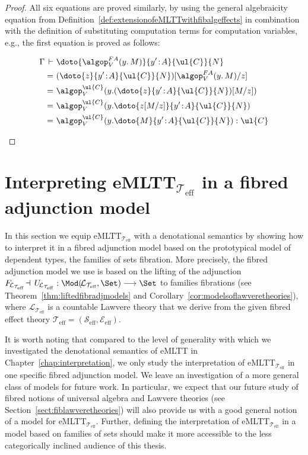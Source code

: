 \pagebreak

\begin{proof}
All six equations are proved similarly, by using the general algebraicity equation from Definition~\ref{def:extensionofeMLTTwithfibalgeffects} in combination with the definition of substituting  computation terms for computation variables, e.g., the first equation is proved as follows:
\begin{fleqn}[0.3cm]
\begin{align*}
\Gamma \,\vdash\,\, & \doto {\algop^{FA}_V(y .\, M)} {y' \!:\! A} {\ul{C}} {N}
\\
=\,\, & (\doto {z} {y' \!:\! A} {\ul{C}} {N})[\algop^{FA}_V(y .\, M)/z]
\\
=\,\, & \algop^{\ul{C}}_V(y. (\doto {z} {y' \!:\! A} {\ul{C}} {N})[M/z])
\\
=\,\, & \algop^{\ul{C}}_V(y. \doto {z[M/z]} {y' \!:\! A} {\ul{C}} {N})
\\
=\,\, & \algop^{\ul{C}}_V(y. \doto {M} {y' \!:\! A} {\ul{C}} {N}) : \ul{C}
\vspace{-1cm}
\end{align*}
\end{fleqn}
\end{proof}


\section{Interpreting eMLTT$_{\!\mathcal{T}_{\text{eff}}}$ in a fibred adjunction model}
\label{sect:fibalgeffectsmodel}

In this section we equip eMLTT$_{\mathcal{T}_{\text{eff}}}$ with a denotational semantics by showing how to interpret it in a fibred adjunction model based on the prototypical model of dependent types, the families of sets fibration. More precisely, the fibred adjunction model we use is based on the lifting of the adjunction $F_{\!\mathcal{L}_{\mathcal{T}_{\text{eff}}}} \!\dashv\, U_{\!\mathcal{L}_{\mathcal{T}_{\text{eff}}}} : \Mod(\!\mathcal{L}_{\mathcal{T}_{\text{eff}}},\Set) \longrightarrow \Set$ to families fibrations (see Theorem~\ref{thm:liftedfibradjmodels} and Corollary~\ref{cor:modelsoflawveretheories}), where $\mathcal{L}_{\mathcal{T}_{\text{eff}}}$ is a countable Lawvere theory that we derive from the given fibred effect theory $\mathcal{T}_{\text{eff}} = (\mathcal{S}_{\text{eff}},\mathcal{E}_{\text{eff}})$. 

It is worth noting that compared to the level of generality with which we investigated the denotational semantics of eMLTT in Chapter~\ref{chap:interpretation}, 
we only study the interpretation of eMLTT$_{\mathcal{T}_{\text{eff}}}$ in one specific fibred adjunction model. We leave an investigation of a more general class of models for future work. In particular, we expect that our future study of fibred notions of universal algebra and Lawvere theories (see Section~\ref{sect:fiblawveretheories}) will also provide us with a good general notion of a model for eMLTT$_{\mathcal{T}_{\text{eff}}}$. Further, defining the interpretation of eMLTT$_{\mathcal{T}_{\text{eff}}}$ in a model based on families of sets should make it more accessible to the less categorically inclined audience of this thesis.


